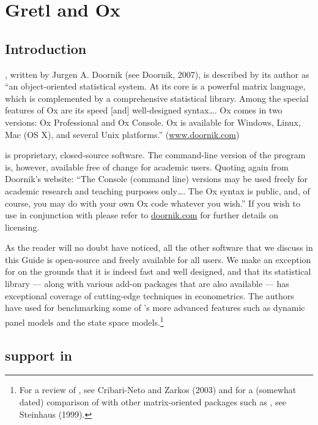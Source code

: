 \chapter{Gretl and Ox}
\label{chap:gretlOx}

\section{Introduction}
\label{Ox-intro}

, written by Jurgen A. Doornik (see Doornik, 2007), is
described by its author as ``an object-oriented statistical system. At
its core is a powerful matrix language, which is complemented by a
comprehensive statistical library. Among the special features of Ox
are its speed [and] well-designed syntax\dots{}.  Ox comes in two
versions: Ox Professional and Ox Console. Ox is available for Windows,
Linux, Mac (OS X), and several Unix platforms.''
(\url{www.doornik.com})

 is proprietary, closed-source software.  The command-line
version of the program is, however, available free of change for
academic users.  Quoting again from Doornik's website: ``The
Console (command line) versions may be used freely for academic
research and teaching purposes only\dots{}. The Ox syntax is public,
and, of course, you may do with your own Ox code whatever you wish.''
If you wish to use  in conjunction with  please
refer to \url{doornik.com} for further details on licensing.

As the reader will no doubt have noticed, all the other software that
we discuss in this Guide is open-source and freely available for all
users.  We make an exception for  on the grounds that it is
indeed fast and well designed, and that its statistical library ---
along with various add-on packages that are also available --- has
exceptional coverage of cutting-edge techniques in econometrics.  The
 authors have used  for benchmarking some of
's more advanced features such as dynamic panel models and
the state space models.\footnote{For a review of , see
  Cribari-Neto and Zarkos (2003) and for a (somewhat dated) comparison
  of  with other matrix-oriented packages such as ,
  see Steinhaus (1999).}

\section{ support in }
\label{sec:Ox-support}

